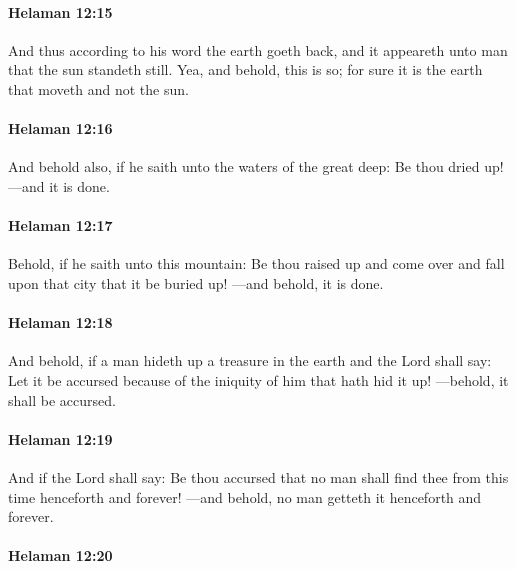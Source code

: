 		\paragraph{Helaman 12:15} %
			\label{HELAMAN-12-15}

			And thus according to his word the earth goeth back,
			and it appeareth unto man that the sun standeth still.
			Yea, and behold, this is so;
			for sure it is the earth that moveth and not the sun.

		\paragraph{Helaman 12:16} %
			\label{HELAMAN-12-16}

			And behold also, if he saith unto the waters of the great deep:
			Be thou dried up!
			---and it is done.

		\paragraph{Helaman 12:17} %
			\label{HELAMAN-12-17}

			Behold, if he saith unto this mountain:
			Be thou raised up and come over and fall upon that city that it be buried up!
			---and behold, it is done.

		\paragraph{Helaman 12:18} %
			\label{HELAMAN-12-18}

			And behold, if a man hideth up a treasure in the earth and the Lord shall say:
			Let it be accursed because of the iniquity of him that hath hid it up!
			---behold, it shall be accursed.

		\paragraph{Helaman 12:19} %
			\label{HELAMAN-12-19}

			And if the Lord shall say:
			Be thou accursed that no man shall find thee from this time henceforth and forever!
			---and behold, no man getteth it henceforth and forever.

		\paragraph{Helaman 12:20} %
			\label{HELAMAN-12-20}

